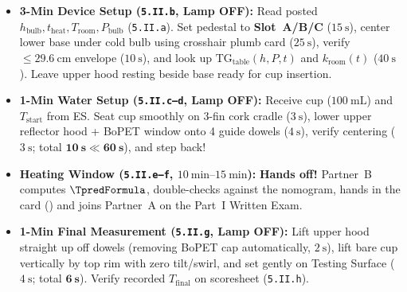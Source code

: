 \begin{twocol}[0.49]
\begin{devicebox}
\begin{itemize}
  \item \textbf{3-Min Device Setup (\texttt{5.II.b}, Lamp OFF):} Read posted $h_{\mathrm{bulb}}, t_{\mathrm{heat}}, T_{\mathrm{room}}, P_{\mathrm{bulb}}$ (\texttt{5.II.a}). Set pedestal to \textbf{Slot~A/B/C} ($\SI{15}{\second}$), center lower base under cold bulb using crosshair plumb card ($\SI{25}{\second}$), verify $\le\SI{29.6}{\centi\meter}$ envelope ($\SI{10}{\second}$), and look up $\mathrm{TG}_{\mathrm{table}}(h, P, t)$ and $k_{\mathrm{room}}(t)$ ($\SI{40}{\second}$). Leave upper hood resting beside base ready for cup insertion.
  \item \textbf{1-Min Water Setup (\texttt{5.II.c--d}, Lamp OFF):} Receive cup ($\SI{100}{\milli\liter}$) and $T_{\mathrm{start}}$ from ES. Seat cup smoothly on 3-fin cork cradle ($\SI{3}{\second}$), lower upper reflector hood + BoPET window onto 4 guide dowels ($\SI{4}{\second}$), verify centering ($\SI{3}{\second}$; total $\mathbf{\SI{10}{\second} \ll \SI{60}{\second}}$), and step back!
  \item \textbf{Heating Window (\texttt{5.II.e--f}, $\SIrange{10}{15}{\minute}$):} \textbf{Hands off!} Partner~B computes $\TpredFormula$, double-checks against the  nomogram, hands in the card (\HandInRule) and joins Partner~A on the Part~I Written Exam.
  \item \textbf{1-Min Final Measurement (\texttt{5.II.g}, Lamp OFF):} Lift upper hood straight up off dowels (removing BoPET cap automatically, $\SI{2}{\second}$), lift bare cup vertically by top rim with zero tilt/swirl, and set gently on Testing Surface ($\SI{4}{\second}$; total $\mathbf{\SI{6}{\second}}$). Verify recorded $T_{\mathrm{final}}$ on scoresheet (\texttt{5.II.h}).
\end{itemize}
\end{devicebox}
\end{twocol}

